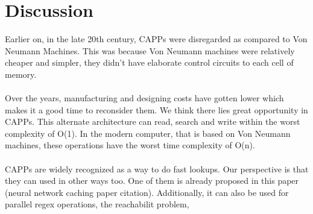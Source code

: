 \section{Discussion}
Earlier on, in the late 20th century, CAPPs were disregarded as compared to Von Neumann Machines. 
This was because Von Neumann machines were relatively cheaper and simpler, they didn't have elaborate control circuits to each cell of memory. 
\\\\
Over the years, manufacturing and designing costs have gotten lower which makes it a good time to reconsider them. We think there lies great opportunity in CAPPs.
This alternate architecture can read, search and write within the worst complexity of O(1). 
In the modern computer, that is based on Von Neumann machines, these operations have the worst time complexity of O(n). 
\\\\
CAPPs are widely recognized as a way to do fast lookups. 
Our perspective is that they can used in other ways too.
One of them is already proposed in this paper (neural network caching paper citation). 
Additionally, it can also be used for parallel regex operations, the reachabilit problem, 